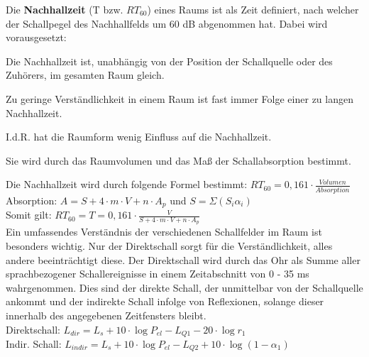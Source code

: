 Die \textbf{Nachhallzeit} (T bzw. $RT_{60}$) eines Raums ist als Zeit definiert, nach welcher der Schallpegel des Nachhallfelds um 60 dB abgenommen hat. Dabei wird vorausgesetzt:
\begin{compactenum}
\item Die Nachhallzeit ist, unabhängig von der Position der Schallquelle oder des Zuhörers, im gesamten Raum gleich.
\item Zu geringe Verständlichkeit in einem Raum ist fast immer Folge einer zu langen Nachhallzeit.
\item I.d.R. hat die Raumform wenig Einfluss auf die Nachhallzeit.
\item Sie wird durch das Raumvolumen und das Maß der Schallabsorption bestimmt.
\end{compactenum}
Die Nachhallzeit wird durch folgende Formel bestimmt: $RT_{60} = 0,161\cdot \frac{Volumen}{Absorption}$ \\
Absorption: $A = S + 4\cdot m\cdot V + n\cdot A_p$ und $S = \Sigma(S_i\alpha_i)$ \\
Somit gilt: $RT_{60} = T = 0,161\cdot \frac{V}{S + 4\cdot m\cdot V + n\cdot A_p}$ \\ [1em]

Ein umfassendes Verständnis der verschiedenen Schallfelder im Raum ist besonders wichtig. Nur der Direktschall sorgt für die Verständlichkeit, alles andere beeinträchtigt diese. Der Direktschall wird durch das Ohr als Summe aller sprachbezogener Schallereignisse in einem Zeitabschnitt von 0 - 35 ms wahrgenommen. Dies sind der direkte Schall, der unmittelbar von der Schallquelle ankommt und der indirekte Schall infolge von Reflexionen, solange dieser innerhalb des angegebenen Zeitfensters bleibt. \\ [1em]
Direktschall: $L_{dir}=L_s + 10\cdot\log P_{el} - L_{Q1} - 20\cdot\log r_1$ \\
Indir. Schall: $L_{indir}=L_s + 10\cdot\log P_{el} - L_{Q2} + 10\cdot\log(1 - \alpha_1)$

